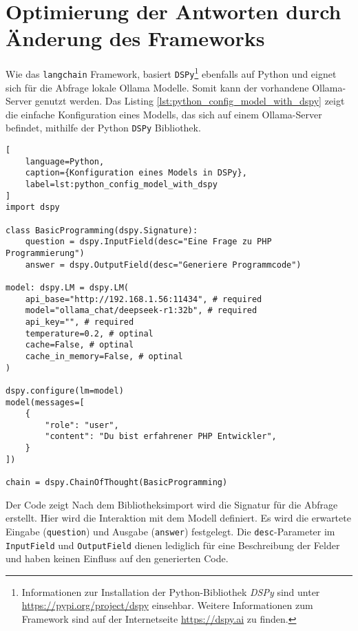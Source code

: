 

\section{Optimierung der Antworten durch Änderung des Frameworks}
Wie das \texttt{langchain} Framework, basiert \texttt{DSPy}\footnote{Informationen zur Installation der Python-Bibliothek \textit{DSPy} sind unter \href{https://pypi.org/project/dspy/}{https://pypi.org/project/dspy} einsehbar. Weitere Informationen zum Framework sind auf der Internetseite \href{https://dspy.ai/}{https://dspy.ai} zu finden.} ebenfalls auf Python und eignet sich für die Abfrage lokale Ollama Modelle. Somit kann der vorhandene Ollama-Server genutzt werden. Das Listing \ref{lst:python_config_model_with_dspy} zeigt die einfache Konfiguration eines Modells, das sich auf einem Ollama-Server befindet, mithilfe der Python \texttt{DSPy} Bibliothek.\vspace{0.2cm}

\begin{lstlisting}[
	language=Python,
	caption={Konfiguration eines Models in DSPy},
	label=lst:python_config_model_with_dspy
]
import dspy

class BasicProgramming(dspy.Signature):
    question = dspy.InputField(desc="Eine Frage zu PHP Programmierung")
    answer = dspy.OutputField(desc="Generiere Programmcode")

model: dspy.LM = dspy.LM(
    api_base="http://192.168.1.56:11434", # required
    model="ollama_chat/deepseek-r1:32b", # required
    api_key="", # required
    temperature=0.2, # optinal
    cache=False, # optinal
    cache_in_memory=False, # optinal
)

dspy.configure(lm=model)
model(messages=[
    {
        "role": "user",
        "content": "Du bist erfahrener PHP Entwickler",
    }
])

chain = dspy.ChainOfThought(BasicProgramming)
\end{lstlisting}

Der Code zeigt Nach dem Bibliotheksimport wird die Signatur für die Abfrage erstellt. Hier wird die Interaktion mit dem Modell definiert. Es wird die erwartete Eingabe (\texttt{question}) und Ausgabe (\texttt{answer}) festgelegt. Die \texttt{desc}-Parameter im \texttt{InputField} und \texttt{OutputField} dienen lediglich für eine Beschreibung der Felder und haben keinen Einfluss auf den generierten Code.\vspace{0.2cm}

